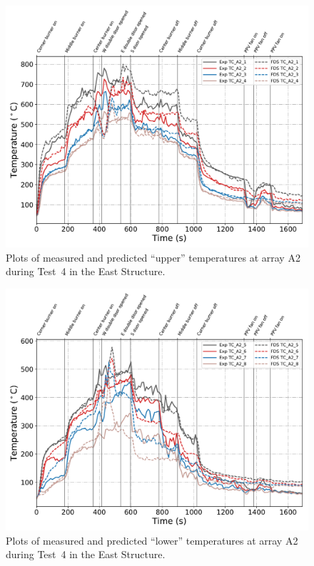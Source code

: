 \clearpage
\begin{figure}[p]
	\centering
	\includegraphics[width=\columnwidth]{Figures/Plots/Validation/Temperature/Test_4_TC_A2_upper}
	\caption{Plots of measured and predicted ``upper'' temperatures at array A2 during Test~4 in the East Structure.}
	\label{fig:TCA2_upper_data_Test4}
\end{figure}
\begin{figure}[p]
	\centering
	\includegraphics[width=\columnwidth]{Figures/Plots/Validation/Temperature/Test_4_TC_A2_lower}
	\caption{Plots of measured and predicted ``lower'' temperatures at array A2 during Test~4 in the East Structure.}
	\label{fig:TCA2_lower_data_Test4}
\end{figure}

